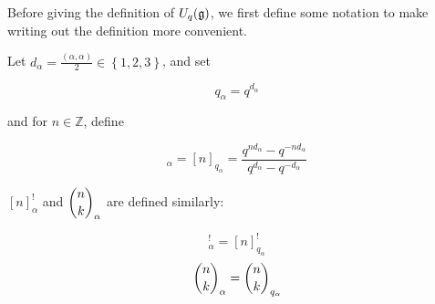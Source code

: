 Before giving the definition of $U_q(\mathfrak{g})$, we first define some notation to
make writing out the definition more convenient.

    Let $d_\alpha = \frac{(\alpha,\alpha)}{2} \in \left\{ 1,2,3 \right\}$, and set 

    \begin{equation}
        q_\alpha = q^{d_\alpha}
    \end{equation}

    and for $n \in \mathbb{Z}$, define

    \begin{equation}
        [n]_\alpha = [n]_{q_\alpha} = \frac{q^{nd_\alpha} - q^{-nd_\alpha}}{q^{d_\alpha} - q^{-d_\alpha}}
    \end{equation}

    $[n]_\alpha^!$ and $\dbinom{n}{k}_\alpha$ are defined similarly: 
    
    \begin{equation}
        [n]_\alpha^! = [n]_{q_{\alpha}}^!
    \end{equation}
    \begin{equation}
        \dbinom{n}{k}_\alpha = \dbinom{n}{k}_{q_\alpha}
    \end{equation}

